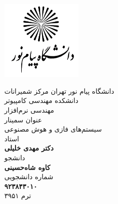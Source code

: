 \thispagestyle{empty}
\vspace*{-28mm}
\centerline{\includegraphics[height=4cm]{Images/pnu-logo.jpg}}
\begin{center}
	\vspace{-2mm}
	{\large
	دانشگاه پیام نور تهران مرکز شمیرانات
	\\[.1cm]
	دانشکده مهندسی کامپیوتر
	\\[.1cm]
		مهندسی نرم‌افزار
	\\[1.7cm]
		عنوان سمینار
	\\[.9cm]
	}
	{\Huge 
		سیستم‌های فازی و هوش مصنوعی
	}
	\\[1.8cm]
	استاد 
	\\[.2cm]
	\textbf{\large {دکتر مهدی خلیلی}}
	\\[1.5cm]
	دانشجو
	\\[.1cm]
	\textbf{\large { کاوه شاه‌حسینی}}
	\\[1.5cm]
	شماره دانشجویی
	\\[.1cm]
	\textbf{\large {۹۲۳۸۴۳۰۱۰‌}}
	\\[1.5cm]
	{\large
		ترم ۳۹۵۱
	}
\end{center}